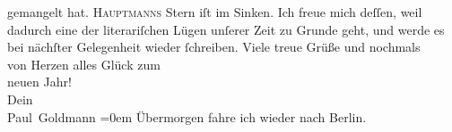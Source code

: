\begin{ledgroupsized}[t]{13cm}
               gemangelt hat. \textsc{Hauptmanns} Stern iſt im Sinken. Ich
               freue mich deſſen, weil dadurch eine der literariſchen Lügen unſerer Zeit zu Grunde
               geht, und werde es bei nächſter Gelegenheit wieder ſchreiben.\pend
           \pstart
           Viele treue Grüße und nochmals {\\[\baselineskip]}von Herzen alles Glück zum {\\[\baselineskip]}neuen Jahr! {\\[\baselineskip]}Dein {\\[\baselineskip]}\spacefill\mbox{Paul Goldmann}\pend
           \leftskip=0em{}\pstart
           \noindent{}Übermorgen fahre ich wieder nach Berlin.\pend
           
         
         \endnumbering{}\end{ledgroupsized}\begin{anhang}\end{anhang}\newcommand{\dateiname}{L02947}\newcommand{\titel}{Paul Goldmann an Arthur Schnitzler, 31. 12. [1900]}\newcommand{\editorInnen}{Martin Anton Müller und Laura Untner}
      